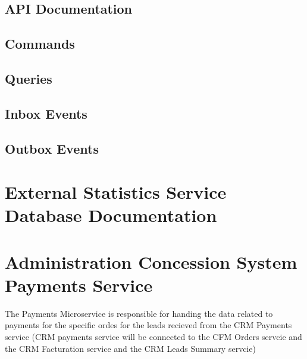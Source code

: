 \documentclass[letterpaper,10pt,english]{sphinxmanual}
\begin{document}


\subsection{API Documentation}
\label{\detokenize{administration_concession_system/external_statistics_service:api-documentation}}

\subsection{Commands}
\label{\detokenize{administration_concession_system/external_statistics_service:commands}}

\subsection{Queries}
\label{\detokenize{administration_concession_system/external_statistics_service:queries}}

\subsection{Inbox Events}
\label{\detokenize{administration_concession_system/external_statistics_service:inbox-events}}

\subsection{Outbox Events}
\label{\detokenize{administration_concession_system/external_statistics_service:outbox-events}}

\section{External Statistics Service Database Documentation}
\label{\detokenize{administration_concession_system/external_statistics_service:external-statistics-service-database-documentation}}
\sphinxstepscope


\section{Administration Concession System Payments Service}
\label{\detokenize{administration_concession_system/payments_service:administration-concession-system-payments-service}}\label{\detokenize{administration_concession_system/payments_service::doc}}
\sphinxAtStartPar
The  Payments Microservice is responsible for handing the data related to payments for the specific ordes for the leads recieved from the CRM Payments service (CRM payments service will be connected to the CFM Orders servcie and the CRM Facturation service and the CRM Leads Summary servcie)
\end{document}
